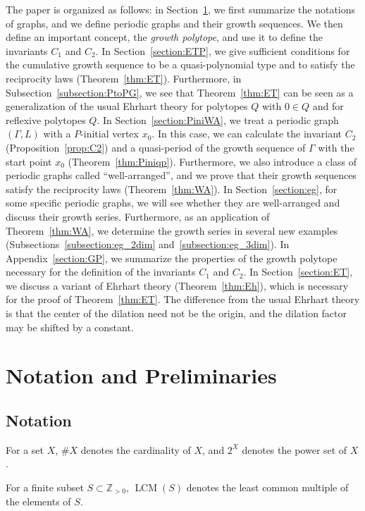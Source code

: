 \documentclass[ALCO,published]{cedram}
\theoremstyle{remark}
\begin{document}
The paper is organized as follows: 
in Section~\ref{section:pre}, we first summarize the notations of graphs,
and we define periodic graphs and their growth sequences. 
We then define an important concept, the \textit{growth polytope}, and use it to define the invariants $C_1$ and $C_2$. 
In Section~\ref{section:ETP}, we give sufficient conditions for the cumulative growth sequence to be a quasi-polynomial type and to satisfy the reciprocity laws (Theorem~\ref{thm:ET}). Furthermore, in Subsection~\ref{subsection:PtoPG}, 
we see that Theorem~\ref{thm:ET} can be seen as a generalization of the usual Ehrhart theory for polytopes $Q$ with $0 \in Q$ and for reflexive polytopes $Q$. 
In Section~\ref{section:PiniWA}, we treat a periodic graph $(\Gamma, L)$ with a $P$-initial vertex $x_0$. In this case, we can calculate the invariant $C_2$ (Proposition~\ref{prop:C2}) and 
a quasi-period of the growth sequence of $\Gamma$ with the start point $x_0$ (Theorem~\ref{thm:Piniqp}).
Furthermore, we also introduce a class of periodic graphs called ``well-arranged'', 
and we prove that their growth sequences satisfy the reciprocity laws (Theorem~\ref{thm:WA}). 
In Section~\ref{section:eg}, for some specific periodic graphs, we will see whether they are well-arranged and discuss their growth series. 
Furthermore, as an application of Theorem~\ref{thm:WA}, we determine the growth series in several new examples (Subsections~\ref{subsection:eg_2dim} and~\ref{subsection:eg_3dim}). 
In Appendix~\ref{section:GP}, we summarize the properties of the growth polytope necessary for the definition of the invariants $C_1$ and $C_2$.
In Section~\ref{section:ET}, we discuss a variant of Ehrhart theory (Theorem~\ref{thm:Eh}), which is necessary for the proof of Theorem~\ref{thm:ET}. The difference from the usual Ehrhart theory is that the center of the dilation need not be the origin, and the dilation factor may be shifted by a constant. 


\section{Notation and Preliminaries}\label{section:pre}

\subsection{Notation}
For a set $X$, $\# X$ denotes the cardinality of $X$, 
and $2 ^X$ denotes the power set of $X$. 

For a finite subset $S \subset \mathbb{Z}_{>0}$, $\operatorname{LCM}(S)$ denotes the least common multiple of the elements of $S$. 
\end{document}
